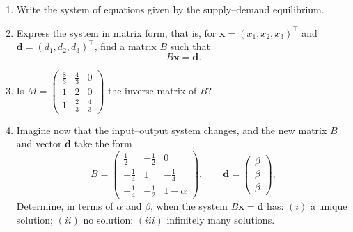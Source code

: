 \documentclass[11pt]{exam}
\begin{document}
\begin{questions}
\begin{enumerate}[leftmargin = 0.5cm, label = (\alph*), rightmargin = 0.2cm]

    \item Write the system of equations given by the supply–demand equilibrium.

    \item Express the system in matrix form, that is, for $\mathbf{x} = (x_1, x_2, x_3)^\top$ and $\mathbf{d} = (d_1, d_2, d_3)^\top$, find a matrix $B$ such that
    \[
        B \mathbf{x} = \mathbf{d}.
    \]

    \item Is 
    $
        M =
        \begin{pmatrix}
            \frac{8}{3} & \frac{4}{3} & 0 \\
            1          & 2          & 0 \\
            1          & \frac{2}{3} & \frac{4}{3}
        \end{pmatrix}
    $
    the inverse matrix of $B$?

    \item Imagine now that the input–output system changes, and the new matrix $B$ and vector $\mathbf{d}$ take the form
    \[
        B =
        \begin{pmatrix}
            \tfrac12 & -\tfrac12 & 0 \\
            -\tfrac14 & 1 & -\tfrac14 \\
            -\tfrac14 & -\tfrac12 & 1-\alpha 
        \end{pmatrix},
        \qquad
        \mathbf{d} =
        \begin{pmatrix}
            \beta \\ \beta \\ \beta
        \end{pmatrix},
    \]
Determine, in terms of $\alpha$ and $\beta$, when the system $B\mathbf{x}=\mathbf{d}$ has: $(i)$ a unique solution; $(ii)$ no solution; $(iii)$ infinitely many solutions.
\end{enumerate}

\begin{solution}[0cm]
\begin{enumerate}[leftmargin = 0.5cm, label = (\alph*), rightmargin = 0.2cm]


\end{enumerate}
\end{solution}
\end{questions}
\end{document}
